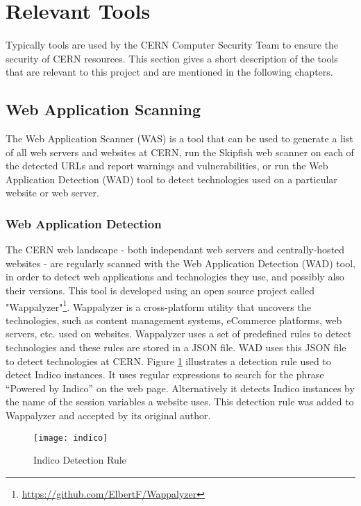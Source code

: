 \section{Relevant Tools}
\label{sec:tools}
\paragraph{}
Typically tools are used by the CERN Computer Security Team to ensure the security of CERN resources. This section gives a short description of the tools that are relevant to this project and are mentioned in the following chapters. 
\subsection{Web Application Scanning} 
The Web Application Scanner (WAS) is a tool that can be used to generate a list of all web servers and websites at CERN, run the Skipfish web scanner on each of the detected URLs and report warnings and vulnerabilities, or run the Web Application Detection (WAD) tool to detect technologies used on a particular website or web server.
\subsubsection{Web Application Detection}

The CERN web landscape - both independant web servers and centrally-hosted websites - are regularly scanned with the Web Application Detection (WAD) tool, in order to detect web applications and technologies they use, and possibly also their versions. This tool is developed using an open source project called "Wappalyzer"\footnote{\url{https://github.com/ElbertF/Wappalyzer}}. Wappalyzer is a cross-platform utility that uncovers the technologies, such as content management systems, eCommerce platforms, web servers, etc. used on websites.  Wappalyzer uses a set of predefined rules to detect technologies and these rules are stored in a JSON file. WAD uses this JSON file to detect technologies at CERN. Figure \ref{figure:indico} illustrates a detection rule used to detect Indico instances. It uses regular expressions to search for the phrase ``Powered by Indico'' on the web page. Alternatively it detects Indico instances by the name of the session variables a website uses. This detection rule was added to Wappalyzer and accepted by its original author.
\begin{figure}[h!]

  \centering
    \texttt{[image: indico]}
  \caption{Indico Detection Rule}
  \label{figure:indico}
\end{figure}
 
